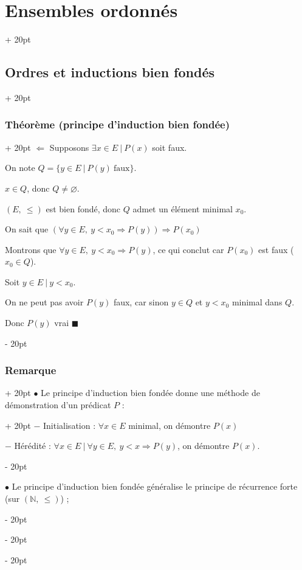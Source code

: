 \documentclass[a4paper, 12pt, twoside]{article}
\newcommand{\N}{\mathbb{N}} %
\renewcommand{\le}{\leqslant}
\newcommand{\ind}[1][20pt]{\advance\leftskip + #1}
\newcommand{\deind}[1][20pt]{\advance\leftskip - #1}
\newenvironment{indt}[2][20pt]{#2 \par \ind[#1]}{\par \deind} %
\begin{document}
\begin{indt}{\section{Ensembles ordonnés}}
\begin{indt}{\subsection{Ordres et inductions bien fondés}}
\begin{indt}{\subsubsection{Théorème (principe d'induction bien fondée)}}
                $\Leftarrow$ Supposons $\exists x \in E\ |\ P(x)$ soit faux.
                
                On note $Q = \{ y \in E\ |\ P(y)\ \text{faux} \}$.
                
                $x \in Q$, donc $Q \neq \varnothing$.
                
                $(E,\ \le)$ est bien fondé, donc $Q$ admet un élément minimal $x_0$.
                
                On sait que $(\forall y \in E,\ y < x_0 \Rightarrow P(y)) \Rightarrow P(x_0)$
                
                Montrons que $\forall y \in E,\ y < x_0 \Rightarrow P(y)$, ce qui conclut car $P(x_0)$ est faux ($x_0 \in Q$).
                
                Soit $y \in E\ |\ y < x_0$.
                
                On ne peut pas avoir $P(y)$ faux, car sinon $y \in Q$ et $y < x_0$ minimal dans $Q$.
                
                Donc $P(y)$ vrai $\blacksquare$
            \end{indt}
            
            \vspace{6pt}
            
            \begin{indt}{\subsubsection{Remarque}}
                \label{1.2.8}
                \begin{indt}{$\bullet$ Le principe d'induction bien fondée donne une méthode de démonstration d'un prédicat $P$ :}
                    $-$ Initialisation : $\forall x \in E$ minimal, on démontre $P(x)$
                    
                    $-$ Hérédité : $\forall x \in E\ |\ \forall y \in E,\ y < x \Rightarrow P(y)$, on démontre $P(x)$.
                \end{indt}
                
                \vspace{6pt}
                
                $\bullet$ Le principe d'induction bien fondée généralise le principe de récurrence forte (sur $(\N, \ \le)$) ;
                
                \vspace{6pt}
                

\end{indt}
\end{indt}
\end{indt}
\end{document}
